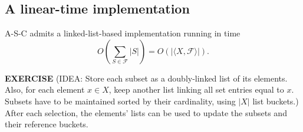 \subsection{A linear-time implementation}
A-S-C admits a linked-list-based implementation running in time
\[O\left(\sum_{S\in\mathcal F}|S|\right)=O(|\langle X,\mathcal F\rangle|).\]
\begin{notesresult}
\textbf{EXERCISE} (IDEA: Store each subset as a doubly-linked list of its elements. Also, for each element $x\in X$, keep another list linking all set entries equal to $x$. Subsets have to be maintained sorted by their cardinality, using $|X|$ list buckets.)
After each selection, the elements' lists can be used to update the subsets and their reference buckets.
\end{notesresult}
